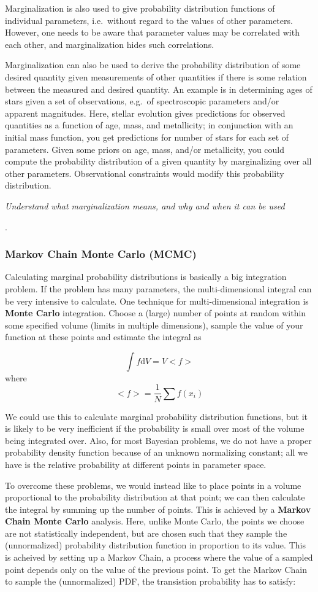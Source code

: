 \documentclass{article}
\newcommand{\test}[1]{%
    \begin{center}
        \colorbox{hl}{\parbox{0.9\textwidth}{\emph{#1}}}
    \end{center}}
\begin{document}
Marginalization is also used to give probability distribution
functions of individual parameters, i.e.\ without regard to the values
of other parameters. However, one needs to be aware that parameter
values may be correlated with each other, and marginalization hides
such correlations.

Marginalization can also be used to derive the probability
distribution of some desired quantity given measurements of other
quantities if there is some relation between the measured and desired
quantity. An example is in determining ages of stars given a set of
observations, e.g.\ of spectroscopic parameters and/or apparent
magnitudes. Here, stellar evolution gives predictions for observed
quantities as a function of age, mass, and metallicity; in conjunction
with an initial mass function, you get predictions for number of stars
for each set of parameters. Given some priors on age, mass, and/or
metallicity, you could compute the probability distribution of a given
quantity by marginalizing over all other parameters. Observational
constraints would modify this probability distribution.

\test{Understand what marginalization means, and why and when it can
be used}.

\subsubsection{Markov Chain Monte Carlo (MCMC)}
Calculating marginal probability distributions is basically a big
integration problem. If the problem has many parameters, the
multi-dimensional integral can be very intensive to calculate.
One technique for multi-dimensional integration is
{\bf Monte Carlo} integration. Choose a (large) number of points
at random within some specified volume (limits in multiple
dimensions), sample the value of your function at these points
and estimate the integral as

$$ \int\! f\mathrm{d}V = V<f> $$
where
$$ <f> = \frac{1}{N}\sum f(x_i) $$

We could use this to calculate marginal probability distribution functions, but
it is likely to be very inefficient if the probability is small over most of
the volume being integrated over. Also, for most Bayesian problems, we do not
have a proper probability density function because of an unknown normalizing
constant; all we have is the relative probability at different points in
parameter space.

To overcome these problems, we would instead like to place points in a volume
proportional to the probability distribution at that point; we can then
calculate the integral by summing up the number of points. This is achieved by
a {\bf Markov Chain Monte Carlo} analysis. Here, unlike Monte Carlo, the
points we choose are not statistically independent, but are chosen such that
they sample the (unnormalized) probability distribution function in proportion
to its value. This is acheived by setting up a Markov Chain, a process where
the value of a sampled point depends only on the value of the previous point.
To get the Markov Chain to sample the (unnormalized) PDF, the transistion
probability has to satisfy:
\end{document}
